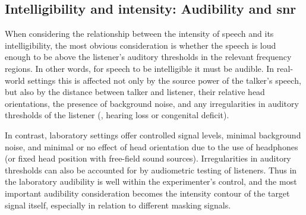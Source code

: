 
\subsection[Intelligibility and intensity]{Intelligibility and intensity: Audibility and \ac{snr}\label{sec:IntelIntens}}
When considering the relationship between the intensity of speech and its intelligibility, the most obvious consideration is whether the speech is loud enough to be above the listener’s auditory thresholds in the relevant frequency regions.  In other words, for speech to be intelligible it must be audible.  In real-world settings this is affected not only by the source power of the talker’s speech, but also by the distance between talker and listener, their relative head orientations, the presence of background noise, and any irregularities in auditory thresholds of the listener (\ie, hearing loss or congenital deficit).

In contrast, laboratory settings offer controlled signal levels, minimal background noise, and minimal or no effect of head orientation due to the use of headphones (or fixed head position with free-field sound sources).  Irregularities in auditory thresholds can also be accounted for by audiometric testing of listeners.  Thus in the laboratory audibility is well within the experimenter’s control, and the most important audibility consideration becomes the intensity contour of the target signal itself, especially in relation to different masking signals.%

